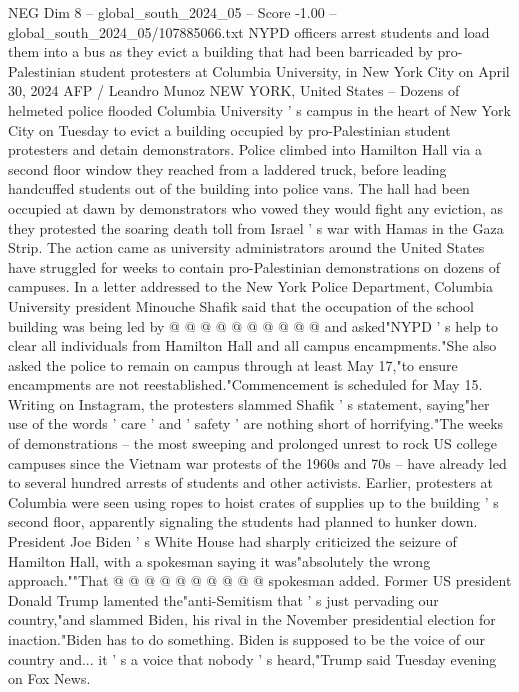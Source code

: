 \begin{textsample}{NEG Dim 8 – global\_south\_2024\_05 – Score -1.00 – global\_south\_2024\_05/107885066.txt}  \label{ex:f8_neg_102}
NYPD officers arrest students and load them into a bus as they evict a building that had been barricaded by pro-Palestinian student protesters at Columbia University, in New York City on April 30, 2024 AFP / Leandro Munoz NEW YORK, United States -- Dozens of helmeted police flooded Columbia University ' s campus in the heart of New York City on Tuesday to evict a building occupied by pro-Palestinian student protesters and detain demonstrators.
Police climbed into Hamilton Hall via a second floor window they reached from a laddered truck, before leading handcuffed students out of the building into police vans.
The hall had been occupied at dawn by demonstrators who vowed they would fight any eviction, as they protested the soaring death toll from Israel ' s war with Hamas in the Gaza Strip.
The action came as university administrators around the United States have struggled for weeks to contain pro-Palestinian demonstrations on dozens of campuses.
In a letter addressed to the New York Police Department, Columbia University president Minouche Shafik said that the occupation of the school building was being led by @ @ @ @ @ @ @ @ @ @ and asked"NYPD ' s help to clear all individuals from Hamilton Hall and all campus encampments."She also asked the police to remain on campus through at least May 17,"to ensure encampments are not reestablished."Commencement is scheduled for May 15.
Writing on Instagram, the protesters slammed Shafik ' s statement, saying"her use of the words ' care ' and ' safety ' are nothing short of horrifying."The weeks of demonstrations -- the most sweeping and prolonged unrest to rock US college campuses since the Vietnam war protests of the 1960s and 70s -- have already led to several hundred arrests of students and other activists.
Earlier, protesters at Columbia were seen using ropes to hoist crates of supplies up to the building ' s second floor, apparently signaling the students had planned to hunker down.
President Joe Biden ' s White House had sharply criticized the seizure of Hamilton Hall, with a spokesman saying it was"absolutely the wrong approach.""That @ @ @ @ @ @ @ @ @ @ spokesman added.
Former US president Donald Trump lamented the"anti-Semitism that ' s just pervading our country,"and slammed Biden, his rival in the November presidential election for inaction."Biden has to do something.
Biden is supposed to be the voice of our country and... it ' s a voice that nobody ' s heard,"Trump said Tuesday evening on Fox News.

\end{textsample}

